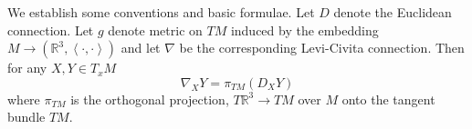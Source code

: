 \documentclass[10pt]{amsart}
\newcommand{\IP}[2]{\left< #1 , #2 \right>}
\newcommand{\R}{\ensuremath{\mathbb{R}}}
\renewcommand{\S}{\ensuremath{\mathbb{S}}}
\newtheorem{thm}{Theorem}[section]
\theoremstyle{remark}
\begin{document}
%
%
%

We establish some conventions and basic formulae. Let \(D\) denote the Euclidean connection. Let \(g\) denote metric on \(TM\) induced by the embedding \(M \to (\R^3, \IP{\cdot}{\cdot})\) and let \(\nabla\) be the corresponding Levi-Civita connection. Then for any \(X, Y \in T_xM\)
\begin{equation}
\label{eq:levi_civita}
\nabla_X Y = \pi_{TM} (D_X Y)
\end{equation}
where \(\pi_{TM}\) is the orthogonal projection, \(T\R^3 \to TM\) over \(M\) onto the tangent bundle \(TM\).
\end{document}
